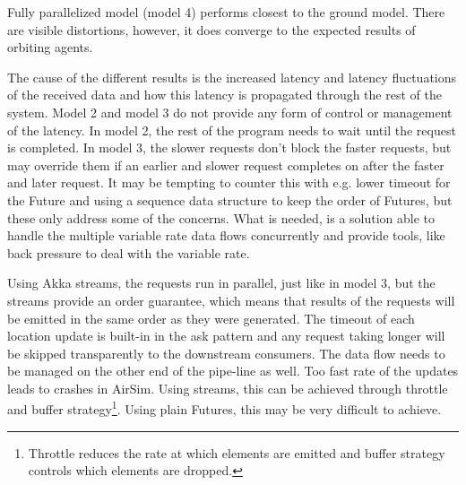 \documentclass{article}
\begin{document}
Fully parallelized model (model 4) performs closest to the ground model. There are visible distortions, however, it does converge to the expected results of orbiting agents.

The cause of the different results is the increased latency and latency fluctuations of the received data and how this latency is propagated through the rest of the system. Model 2 and model 3 do not provide any form of control or management of the latency. In model 2, the rest of the program needs to wait until the request is completed. In model 3, the slower requests don't block the faster requests, but may override them if an earlier and slower request completes on after the faster and later request. It may be tempting to counter this with e.g. lower timeout for the Future and using a sequence data structure to keep the order of Futures, but these only address some of the concerns. What is needed, is a solution able to handle the multiple variable rate data flows concurrently and provide tools, like back pressure to deal with the variable rate.

Using Akka streams, the requests run in parallel, just like in model 3, but the streams provide an order guarantee, which means that results of the requests will be emitted in the same order as they were generated. The timeout of each location update is built-in in the ask pattern and any request taking longer will be skipped transparently to the downstream consumers. The data flow needs to be managed on the other end of the pipe-line as well. Too fast rate of the updates leads to crashes in AirSim. Using streams, this can be achieved through throttle and buffer strategy\footnote{Throttle reduces the rate at which elements are emitted and buffer strategy controls which elements are dropped.}. Using plain Futures, this may be very difficult to achieve.
\end{document}
